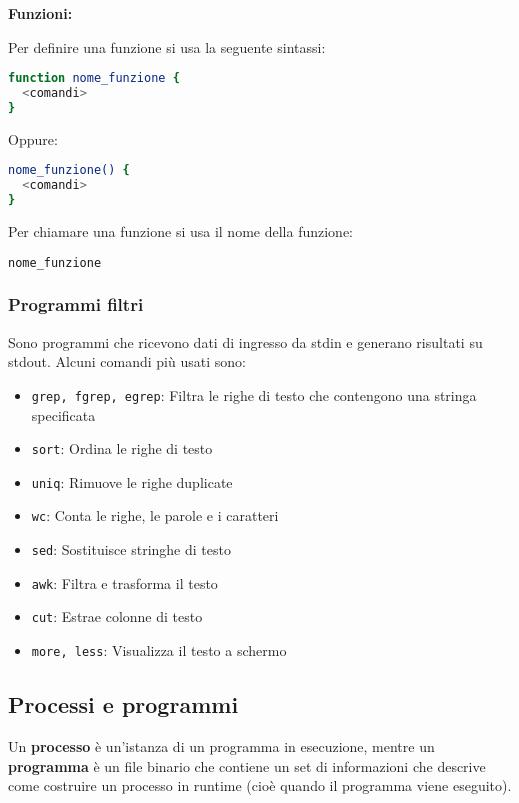 \documentclass[a4paper]{article}
\begin{document}
\vspace{1em}
\noindent
\textbf{Funzioni:}

\noindent
Per definire una funzione si usa la seguente sintassi:
\begin{lstlisting}[language=bash]
function nome_funzione {
  <comandi>
}
\end{lstlisting}
Oppure:
\begin{lstlisting}[language=bash]
nome_funzione() {
  <comandi>
}
\end{lstlisting}
Per chiamare una funzione si usa il nome della funzione:
\begin{lstlisting}[language=bash]
nome_funzione
\end{lstlisting}

\subsubsection{Programmi filtri}
Sono programmi che ricevono dati di ingresso da stdin e generano risultati su stdout.
Alcuni comandi più usati sono:
\begin{itemize}
  \item \texttt{grep, fgrep, egrep}: Filtra le righe di testo che contengono una stringa specificata
  \item \texttt{sort}: Ordina le righe di testo
  \item \texttt{uniq}: Rimuove le righe duplicate
  \item \texttt{wc}: Conta le righe, le parole e i caratteri
  \item \texttt{sed}: Sostituisce stringhe di testo
  \item \texttt{awk}: Filtra e trasforma il testo
  \item \texttt{cut}: Estrae colonne di testo
  \item \texttt{more, less}: Visualizza il testo a schermo
\end{itemize}

\subsection{Processi e programmi}
Un \textbf{processo} è un'istanza di un programma in esecuzione, mentre un \textbf{programma}
è un file binario che contiene un set di informazioni che descrive come costruire un
processo in runtime (cioè quando il programma viene eseguito).
\end{document}
